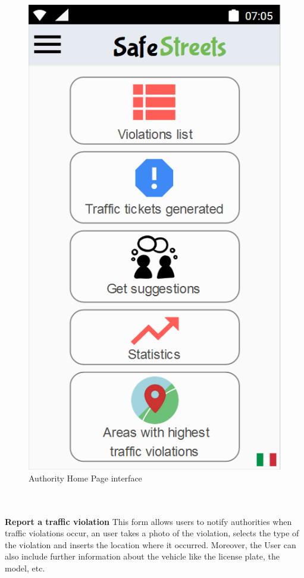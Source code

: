     \begin{figure}[h]
    \centering
    \includegraphics[scale=1]{Images/authority_menu.png}
    \caption{Authority Home Page interface}
    \end{figure}
    $          $\newline\\\\
    \textbf{Report a traffic violation}\newline
    This form allows users to notify authorities when traffic violations occur, an user takes a photo of the violation, selects the type of the violation and inserts the location where it occurred. Moreover, the User can also include further information about the vehicle like the license plate, the model, etc.
